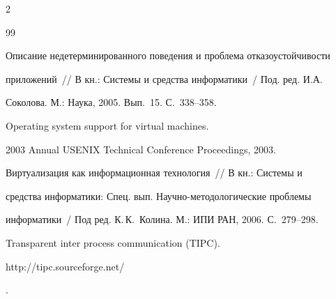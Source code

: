 \begin{multicols}{2}
{{\begin{thebibliography}{99}


Описание недетерминированного поведения и проблема отказоустойчивости

приложений~// В кн.: Системы и средства информатики~/ Под. ред. И.А.

Соколова. М.: Наука, 2005.  Вып.~15. С.~338--358.





Operating system support for virtual machines.

2003 Annual USENIX Technical Conference Proceedings, 2003.





Виртуализация как информационная технология~// В кн.: Системы и

средства информатики: Спец. вып. Научно-методологические проблемы

информатики~/ Под ред. К.\,К.~Колина. М.: ИПИ РАН, 2006. С.~279--298.





Transparent inter process communication (TIPC). {\sf

http://tipc.sourceforge.net/}.

\end{thebibliography}



}

}



\end{multicols}











%


